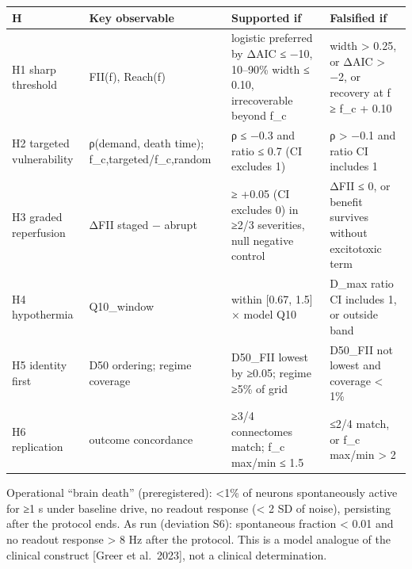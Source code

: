 \documentclass[11pt]{article}
\newcounter{none}
\begin{document}
{\def\LTcaptype{none} %
\begin{longtable}[]{@{}
  >{\raggedright\arraybackslash}p{}
  >{\raggedright\arraybackslash}p{}
  >{\raggedright\arraybackslash}p{}
  >{\raggedright\arraybackslash}p{}@{}}
\toprule\noalign{}
\begin{minipage}[b]{\linewidth}\raggedright
H
\end{minipage} & \begin{minipage}[b]{\linewidth}\raggedright
Key observable
\end{minipage} & \begin{minipage}[b]{\linewidth}\raggedright
Supported if
\end{minipage} & \begin{minipage}[b]{\linewidth}\raggedright
Falsified if
\end{minipage} \\
\midrule\noalign{}
\endhead
\bottomrule\noalign{}
\endlastfoot
H1 sharp threshold & FII(f), Reach(f) & logistic preferred by ΔAIC ≤ −10, 10--90\% width ≤ 0.10, irrecoverable beyond f\_c & width \textgreater{} 0.25, or ΔAIC \textgreater{} −2, or recovery at f ≥ f\_c + 0.10 \\
H2 targeted vulnerability & ρ(demand, death time); f\_c,targeted/f\_c,random & ρ ≤ −0.3 and ratio ≤ 0.7 (CI excludes 1) & ρ \textgreater{} −0.1 and ratio CI includes 1 \\
H3 graded reperfusion & ΔFII staged − abrupt & ≥ +0.05 (CI excludes 0) in ≥2/3 severities, null negative control & ΔFII ≤ 0, or benefit survives without excitotoxic term \\
H4 hypothermia & Q10\_window & within {[}0.67, 1.5{]} × model Q10 & D\_max ratio CI includes 1, or outside band \\
H5 identity first & D50 ordering; regime coverage & D50\_FII lowest by ≥0.05; regime ≥5\% of grid & D50\_FII not lowest and coverage \textless{} 1\% \\
H6 replication & outcome concordance & ≥3/4 connectomes match; f\_c max/min ≤ 1.5 & ≤2/4 match, or f\_c max/min \textgreater{} 2 \\
\end{longtable}
}

Operational ``brain death'' (preregistered): \textless1\% of neurons spontaneously active for ≥1 s under baseline drive, no readout response (\textless{} 2 SD of noise), persisting after the protocol ends. As run (deviation S6): spontaneous fraction \textless{} 0.01 and no readout response \textgreater{} 8 Hz after the protocol. This is a model analogue of the clinical construct {[}Greer et al.~2023{]}, not a clinical determination.
\end{document}
